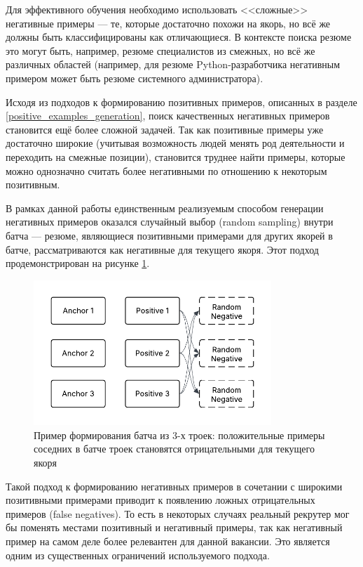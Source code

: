 \documentclass[14pt]{mmcs_article}
\begin{document}
Для эффективного обучения необходимо использовать <<сложные>> негативные примеры --- те, которые достаточно похожи на якорь, но всё же должны быть классифицированы как отличающиеся. В контексте поиска резюме это могут быть, например, резюме специалистов из смежных, но всё же различных областей (например, для резюме Python-разработчика негативным примером может быть резюме системного администратора).

Исходя из подходов к формированию позитивных примеров, описанных в разделе \ref{positive_examples_generation}, поиск качественных негативных примеров становится ещё более сложной задачей. Так как позитивные примеры уже достаточно широкие (учитывая возможность людей менять род деятельности и переходить на смежные позиции), становится труднее найти примеры, которые можно однозначно считать более негативными по отношению к некоторым позитивным.

В рамках данной работы единственным реализуемым способом генерации негативных примеров оказался случайный выбор (random sampling) внутри батча --- резюме, являющиеся позитивными примерами для других якорей в батче, рассматриваются как негативные для текущего якоря. Этот подход продемонстрирован на рисунке \ref{fig:batch_triplets}.

\begin{figure}[h]
  \centering
  \includegraphics[width=0.8\textwidth]{plots/batch_triplets.pdf}
  \caption{\centering Пример формирования батча из 3-х троек: положительные примеры соседних в батче троек становятся отрицательными для текущего якоря}
  \label{fig:batch_triplets}
\end{figure}

Такой подход к формированию негативных примеров в сочетании с широкими позитивными примерами приводит к появлению ложных отрицательных примеров (false negatives). То есть в некоторых случаях реальный рекрутер мог бы поменять местами позитивный и негативный примеры, так как негативный пример на самом деле более релевантен для данной вакансии. Это является одним из существенных ограничений используемого подхода.
\end{document}
